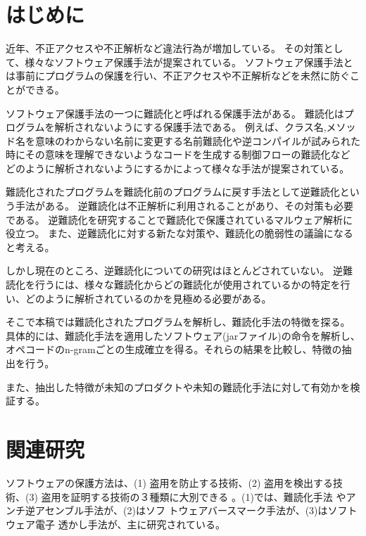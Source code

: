 \documentclass[12pt,twoside]{jbook}
\begin{document}
\listoffigures         %
\listoftables          %


%
%
%
\chapter{はじめに}

近年、不正アクセスや不正解析など違法行為が増加している。
その対策として、様々なソフトウェア保護手法が提案されている。
ソフトウェア保護手法とは事前にプログラムの保護を行い、不正アクセスや不正解析などを未然に防ぐことができる。

ソフトウェア保護手法の一つに難読化と呼ばれる保護手法がある。
難読化はプログラムを解析されないようにする保護手法である。
例えば、クラス名,メソッド名を意味のわからない名前に変更する名前難読化や逆コンパイルが試みられた時にその意味を理解できないようなコードを生成する制御フローの難読化など
どのように解析されないようにするかによって様々な手法が提案されている。


難読化されたプログラムを難読化前のプログラムに戻す手法として逆難読化という手法がある。
逆難読化は不正解析に利用されることがあり、その対策も必要である。
逆難読化を研究することで難読化で保護されているマルウェア解析に役立つ。
また、逆難読化に対する新たな対策や、難読化の脆弱性の議論になると考える。

しかし現在のところ、逆難読化についての研究はほとんどされていない。
逆難読化を行うには、様々な難読化からどの難読化が使用されているかの特定を行い、どのように解析されているのかを見極める必要がある。

そこで本稿では難読化されたプログラムを解析し、難読化手法の特徴を探る。
具体的には、難読化手法を適用したソフトウェア(jarファイル)の命令を解析し、オペコードのn-gramごとの生成確立を得る。それらの結果を比較し、特徴の抽出を行う。

また、抽出した特徴が未知のプロダクトや未知の難読化手法に対して有効かを検証する。

\chapter{関連研究}\label{sect:related}
ソフトウェアの保護方法は、(1) 盗用を防止する技術、(2) 盗用を検出する技
術、(3) 盗用を証明する技術の３種類に大別できる
\cite{collberg09surreptitious}。(1)では、難読化手法
\cite{tyma00patent,monden97ieice}やアンチ逆アセンブル手法が、(2)はソフ
トウェアバースマーク手法\cite{tamada05ieice}が、(3)はソフトウェア電子
透かし手法\cite{collberg99popl}が、主に研究されている。
\end{document}
